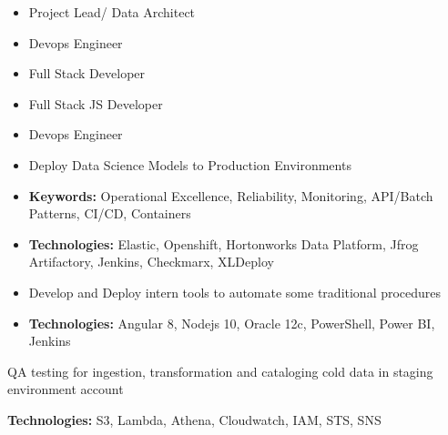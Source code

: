 \documentclass[10pt,a4paper,ragged2e]{altacv}
\begin{document}
\begin{paracol}{2}

\begin{itemize}
\item Project Lead/ Data Architect
\item Devops Engineer
\item Full Stack Developer
\end{itemize}

\divider

\begin{itemize}
\item Full Stack JS Developer
\item Devops Engineer
\end{itemize}


\begin{itemize}
\item Deploy Data Science Models to Production Environments
\item \textbf{Keywords:} Operational Excellence, Reliability, Monitoring, API/Batch Patterns, CI/CD, Containers
\item \textbf{Technologies:} Elastic, Openshift, Hortonworks Data Platform, Jfrog Artifactory, Jenkins, Checkmarx, XLDeploy
\end{itemize}

\divider

\begin{itemize}
\item Develop and Deploy intern tools to automate some traditional procedures
\item \textbf{Technologies:} Angular 8, Nodejs 10, Oracle 12c, PowerShell, Power BI, Jenkins
\end{itemize}
\medskip

\divider
{}
\item QA testing for ingestion, transformation and cataloging cold data in staging environment account  
\item \textbf{Technologies:} S3, Lambda, Athena, Cloudwatch, IAM, STS, SNS
\medskip


\end{paracol}
\end{document}
